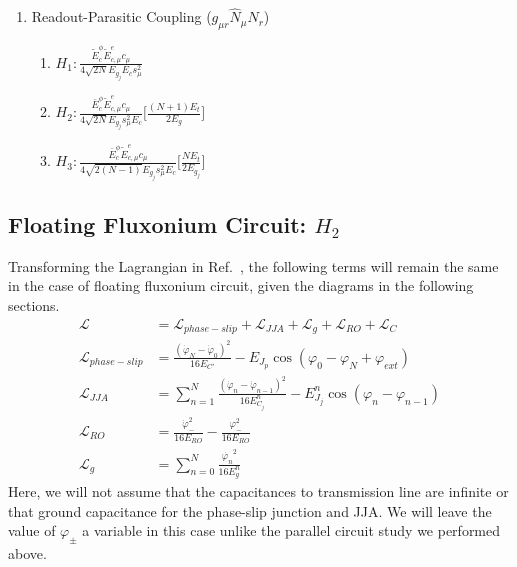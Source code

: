 \documentclass[%
reprint,
superscriptaddress,
 amsmath,amssymb,
 aps,
 prx,
longbibliography,
floatfix,
]{revtex4-2}
\begin{document}
\begin{enumerate}
\item Readout-Parasitic Coupling ($g_{\mu r}\hat N_\mu \hat N_r$)
    \begin{enumerate}
        \item $H_1: \frac{\tilde{E}^\phi_c\tilde{E}^e_{c,\mu}c_\mu}{4\sqrt{2N}E_{g_j}E_cs_\mu^2}$
        \item $H_2:\frac{\bar{E}^\phi_c\tilde{E}^{e}_{c,\mu}c_\mu }{4\sqrt{2N}E_{g_j}s_\mu^2E_c}\Big[\frac{(N+1)E_t}{2E_g} \Big]$
        \item $H_3:\frac{\bar{E}^\phi_c\tilde{E}^{e}_{c,\mu}c_\mu }{4\sqrt{2(N-1)}E_{g_j}s_\mu^2E_c}\Big[\frac{NE_t}{2E_{g_j}} \Big]$
    \end{enumerate}
   
\end{enumerate}
\subsection{Floating Fluxonium Circuit: $H_2$}
Transforming the Lagrangian in Ref.~\cite{viola2015collective}, the following terms will remain the same in the case of floating fluxonium circuit, given the diagrams in the following sections.
\begin{align}
    \mathcal{L}&=\mathcal{L}_{phase-slip}+\mathcal{L}_{JJA}+\mathcal{L}_{g}+\mathcal{L}_{RO}+\mathcal{L}_{C}\\
    \mathcal{L}_{phase-slip}&=\frac{(\dot{\varphi}_N-\dot{\varphi}_0)^2}{16E_{C'}}-E_{J_p}\cos(\varphi_0-\varphi_{N}+\varphi_{ext})\\
    \mathcal{L}_{JJA}&=\sum_{n=1}^N\frac{(\dot{\varphi}_n-\dot{\varphi}_{n-1})^2}{16E^{n}_{C_j}}-E^{n}_{J_j}\cos(\varphi_n-\varphi_{n-1})\\
    \mathcal{L}_{RO}&=\frac{\dot{\varphi}_{-}^2}{16E_{{RO}}}-\frac{\varphi_{-}^2}{16E_{RO}}\\
    \mathcal{L}_{g}&=\sum_{n=0}^N \frac{\dot{\varphi_n}^2}{16E^n_{g}}\label{eq:float-float}
  \end{align}
  Here, we will not assume that the capacitances to transmission line are infinite or that ground capacitance for the phase-slip junction and JJA. We will leave the value of $\varphi_{\pm}$ a variable in this case unlike the parallel circuit study we performed above.
\end{document}

